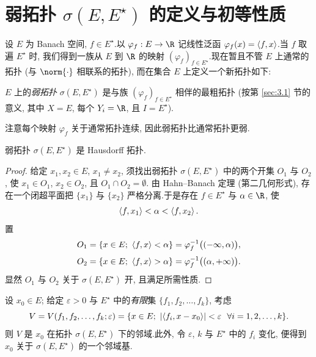 \section{弱拓扑 $\sigma(E,E^\star)$ 的定义与初等性质}
\label{sec:3.2}

设 $E$ 为 Banach 空间, $f\in E^\star$.以 $\varphi_f:E\to\R$ 记线性泛函
$\varphi_f(x)=\left\langle f,x\right\rangle$.当 $f$ 取遍 $E^\star$ 时, 我们得到一族从 $E$ 到 $\R$
的映射 $(\varphi_f)_{f\in E^\star}$.现在暂且不管 $E$ 上通常的拓扑 (与 $\norm{\cdot}$
相联系的拓扑), 而在集合 $E$ 上定义一个新拓扑如下:

\begin{definition}
$E$ 上的\emph{弱拓扑} $\sigma(E,E^\star)$ 是与族 $(\varphi_f)_{f\in E^\star}$
相伴的最粗拓扑 (按第  \ref{sec:3.1} 节的意义, 其中 $X=E$, 每个 $Y_i=\R$, 且
$I=E^\star$).
\end{definition}

注意每个映射 $\varphi_f$ 关于通常拓扑连续, 因此弱拓扑比通常拓扑更弱.

\begin{proposition}
\label{prop:3.3}
弱拓扑 $\sigma(E,E^\star)$ 是 Hausdorff 拓扑.
\end{proposition}

\begin{proof}
给定 $x_1,x_2\in E$, $x_1\ne x_2$, 须找出弱拓扑 $\sigma(E,E^\star)$ 中的两个开集
$O_1$ 与 $O_2$, 使 $x_1\in O_1$, $x_2\in O_2$, 且 $O_1\cap O_2=\emptyset$.
由 Hahn--Banach 定理 (第二几何形式), 存在一个闭超平面把 $\{x_1\}$ 与 $\{x_2\}$
严格分离.于是存在 $f\in E^\star$ 与 $\alpha\in\R$, 使
\begin{equation*}
\left\langle f,x_1\right\rangle<\alpha<\left\langle f,x_2\right\rangle.
\end{equation*}
置
\begin{equation*}
O_1=\{x\in E;\ \dual{f}{x}<\alpha\}=\varphi_f^{-1}\bigl((-\infty,\alpha)\bigr),
\end{equation*}
\begin{equation*}
O_2=\{x\in E;\ \dual{f}{x}>\alpha\}=\varphi_f^{-1}\bigl((\alpha,+\infty)\bigr).
\end{equation*}
显然 $O_1$ 与 $O_2$ 关于 $\sigma(E,E^\star)$ 开, 且满足所需性质.
\end{proof}

\begin{keyproposition}
\label{prop:3.4}
设 $x_0\in E$; 给定 $\varepsilon>0$ 与 $E^\star$ 中的\emph{有限}集
$\{f_1,f_2,\dots,f_k\}$, 考虑
\begin{equation*}
V=V(f_1,f_2,\dots,f_k;\varepsilon)
=\{x\in E;\ \left|\left\langle f_i,x-x_0\right\rangle\right|<\varepsilon\ \ \forall i=1,2,\dots,k\}.
\end{equation*}
则 $V$ 是 $x_0$ 在拓扑 $\sigma(E,E^\star)$ 下的邻域.此外, 令 $\varepsilon$, $k$ 与
$E^\star$ 中的 $f_i$ 变化, 便得到 $x_0$ 关于 $\sigma(E,E^\star)$ 的一个邻域基.
\end{keyproposition}

